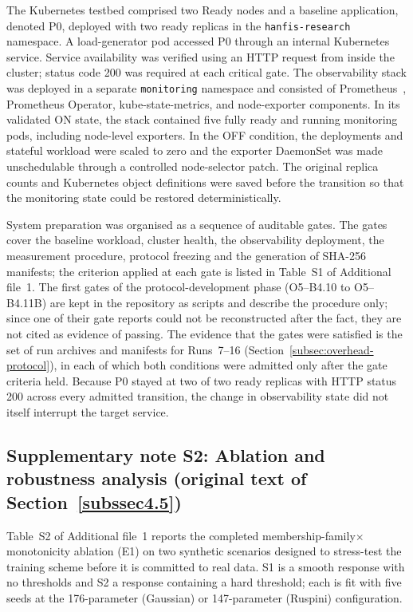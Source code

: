 \documentclass[pdflatex,sn-basic]{sn-jnl}
\theoremstyle{thmstyleone}%
\theoremstyle{thmstyletwo}%
\theoremstyle{thmstylethree}%
\begin{document}
The Kubernetes testbed comprised two Ready nodes and a baseline application, denoted P0, deployed with two ready replicas in the \texttt{hanfis-research} namespace. A load-generator pod accessed P0 through an internal Kubernetes service. Service availability was verified using an HTTP request from inside the cluster; status code 200 was required at each critical gate. The observability stack was deployed in a separate \texttt{monitoring} namespace and consisted of Prometheus~\citep{prometheus_overview}, Prometheus Operator, kube-state-metrics, and node-exporter components. In its validated ON state, the stack contained five fully ready and running monitoring pods, including node-level exporters. In the OFF condition, the deployments and stateful workload were scaled to zero and the exporter DaemonSet was made unschedulable through a controlled node-selector patch. The original replica counts and Kubernetes object definitions were saved before the transition so that the monitoring state could be restored deterministically.

System preparation was organised as a sequence of auditable gates. The gates cover the baseline workload, cluster health, the observability deployment, the measurement procedure, protocol freezing and the generation of SHA-256 manifests; the criterion applied at each gate is listed in Table~S1 of Additional file~1. The first gates of the protocol-development phase (O5--B4.10 to O5--B4.11B) are kept in the repository as scripts and describe the procedure only; since one of their gate reports could not be reconstructed after the fact, they are not cited as evidence of passing. The evidence that the gates were satisfied is the set of run archives and manifests for Runs~7--16 (Section~\ref{subsec:overhead-protocol}), in each of which both conditions were admitted only after the gate criteria held. Because P0 stayed at two of two ready replicas with HTTP status 200 across every admitted transition, the change in observability state did not itself interrupt the target service.

\subsection*{Supplementary note S2: Ablation and robustness analysis (original text of Section~\ref{subssec4.5})}
Table~S2 of Additional file~1 reports the completed membership-family$\times$monotonicity ablation (E1) on
two synthetic scenarios designed to stress-test the training scheme before it is committed to real data. S1 is a smooth response with no thresholds and S2 a response containing a hard threshold; each is fit with five seeds at the 176-parameter (Gaussian) or 147-parameter (Ruspini) configuration.
\end{document}
